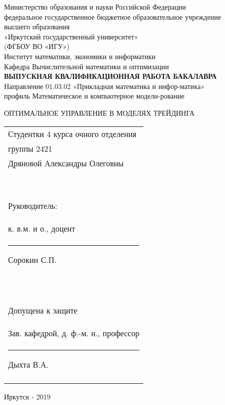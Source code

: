 
\singlespacing
\begin{titlepage}
\begin{center}
\hfill \break
\normalsize{Министерство образования и науки Российской Федерации \\ федеральное государственное бюджетное образовательное учреждение}\\
 
\normalsize{высшего образования}\\
\normalsize{«Иркутский государственный университет» }\\
\normalsize{(ФГБОУ ВО «ИГУ»)}\\
\hfill \break
\normalsize{Институт математики, экономики и информатики}\\
\normalsize{Кафедра Вычислительной математики и оптимизации}\\
\hfill \break
\hfill \break
\hfill \break
\hfill \break
\hfill \break
\large{\textbf{ВЫПУСКНАЯ КВАЛИФИКАЦИОННАЯ РАБОТА
БАКАЛАВРА}}\\
\hfill \break
\normalsize{
Направление  01.03.02 «Прикладная математика и инфор-матика»\\
профиль Математическое и компьютерное модели-рование }\\
\hfill \break
 
\normalsize{ОПТИМАЛЬНОЕ УПРАВЛЕНИЕ В МОДЕЛЯХ ТРЕЙДИНГА} 
\end{center}
\hfill \break
\hfill \break
\begin{flushright} %
\begin{tabular}{p{}} %


Студентки 4 курса очного отделения\\
группы 2421\\
Дряновой Александры Олеговны\\\

Руководитель:\\
к. в.м. и о., доцент\\
\rule{3cm}{0.25pt}  Сорокин С.П.\\\

Допущена к защите\\
Зав. кафедрой, д. ф.-м. н., профессор\\
 \rule{3cm}{0.25pt}  Дыхта В.А.\\\\

\end{tabular}
\end{flushright}
\hfill \break
\begin{center} Иркутск - 2019 \end{center}
\thispagestyle{empty}
\end{titlepage}

\onehalfspacing